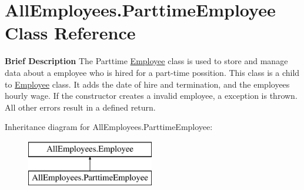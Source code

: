 \hypertarget{class_all_employees_1_1_parttime_employee}{}\section{All\+Employees.\+Parttime\+Employee Class Reference}
\label{class_all_employees_1_1_parttime_employee}


{\bfseries Brief Description} The Parttime \hyperlink{class_all_employees_1_1_employee}{Employee} class is used to store and manage data about a employee who is hired for a part-\/time possition. This class is a child to \hyperlink{class_all_employees_1_1_employee}{Employee} class. It adds the date of hire and termination, and the employees hourly wage. If the constructor creates a invalid employee, a exception is thrown. All other errors result in a defined return.  


Inheritance diagram for All\+Employees.\+Parttime\+Employee\+:\begin{figure}[H]
\begin{center}
\leavevmode
\includegraphics[height=2.000000cm]{class_all_employees_1_1_parttime_employee}
\end{center}
\end{figure}
